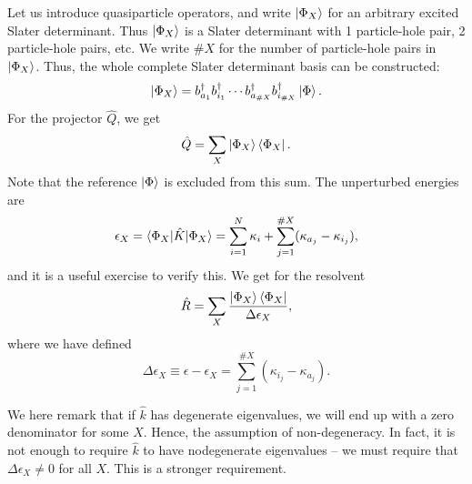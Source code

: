 \documentclass{report}
\theoremstyle{plain}
\theoremstyle{definition}
\begin{document}
Let us introduce quasiparticle operators, and write $\ket{\Phi_X}$
for an arbitrary excited Slater determinant. Thus $\ket{\Phi_X}$ is a
Slater determinant with 1 particle-hole pair, 2 particle-hole pairs,
etc. We write $\# X$ for the number of particle-hole pairs in
$\ket{\Phi_X}$. Thus, the whole complete Slater determinant basis can
be constructed:
\begin{equation}
  \ket{\Phi_X} = b^\dag_{a_1} b^\dag_{i_1} \cdots b^\dag_{a_{\# X}}
  b^\dag_{i_{\# X}} \ket{\Phi}.
\end{equation}
For the projector $\hat{Q}$, we get
\begin{equation}
  \hat{Q} =\sum_X \ket{\Phi_X}\bra{\Phi_X}.
\end{equation}
Note that the reference $\ket{\Phi}$ is excluded from this sum.
The unperturbed energies are
\begin{equation}
  \epsilon_X = \braket{\Phi_X|\hat{K}|\Phi_X} = \sum_{i=1}^N \kappa_i + \sum_{j=1}^{\# X}
  (\kappa_{a_j} - \kappa_{i_j}),
\end{equation}
and it is a useful exercise to verify this.
We get for the resolvent
\begin{equation}
  \hat{R} = \sum_X \frac{\ket{\Phi_X}\bra{\Phi_X}}{\Delta \epsilon_X} ,
\end{equation}
where we have defined
\begin{equation}
\Delta \epsilon_X \equiv \epsilon - \epsilon_X = {\sum_{j=1}^{\# X}
    (\kappa_{i_j} - \kappa_{a_j})}.
\end{equation}

We here remark that if $\hat{k}$ has degenerate eigenvalues, we will 
end up with a zero denominator for some $X$. Hence, the assumption of
non-degeneracy. In fact, it is not enough to require $\hat{k}$ to have
nodegenerate eigenvalues -- we must require that $\Delta \epsilon_X
\neq 0$ for all $X$. This is a stronger requirement.
\end{document}
